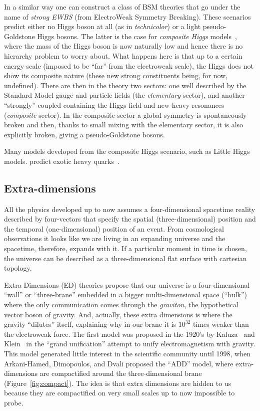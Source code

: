 In a similar way one can construct 
a class of BSM theories that go under the name
of {\it strong EWBS} (from ElectroWeak Symmetry Breaking).
These scenarios predict either no Higgs boson at all 
(as in {\it technicolor})
or a light pseudo-Goldstone Higgs bosons. The latter
is the case for {\it composite Higgs} models~\cite{Vecchi:2013bja,delAguila:2010vg}, 
where the mass of the Higgs boson is now naturally low and
hence there is no hierarchy problem to worry about.
What happens here is that up to a certain energy scale
(imposed to be ``far'' from the electroweak scale), the
Higgs does not show its composite nature (these new strong
constituents being, for now, undefined). There are then
in the theory two sectors: one well described by 
the Standard Model gauge and particle fields (the 
{\it elementary} sector), and another ``strongly'' coupled
containing the Higgs field and new heavy resonances 
({\it composite} sector).
In the composite sector a global symmetry is spontaneously 
broken and then, thanks to small mixing with the
elementary sector, it is also explicitly broken, giving
a pseudo-Goldstone bosons. 

Many models developed from the composite Higgs scenario,
such as Little Higgs models. predict
exotic heavy quarks~\cite{Contino:2008hi,Mrazek:2009yu}.


\subsection{Extra-dimensions}\label{sec:extradimensions}

All the physics developed up to now assumes a 
four-dimensional spacetime reality described 
by four-vectors that specify the spatial (three-dimensional) 
position and the temporal (one-dimensional) position of
an event.
From cosmological observations it looks like
we are living in an expanding universe and the
spacetime, therefore, expands with it.
If a particular moment in time is chosen, the
universe can be described as a three-dimensional 
flat surface with cartesian topology.

Extra Dimensions (ED) theories propose that
our universe is a four-dimensional ``wall'' or 
``three-brane'' embedded in a bigger multi-dimensional space 
(``bulk'') where the only communication comes through
the {\it graviton}, the hypothetical vector boson of gravity.
And, actually, these extra dimensions is where the gravity
``dilutes'' itself, explaining why in our brane it is
$10^{32}$ times weaker than the electroweak force.
The first model was proposed in the 1920's by
Kaluza~\cite{Kaluza} and Klein~\cite{Klein} 
in the ``grand unification''
attempt to unify electromagnetism with gravity.
This model generated little interest in the scientific community 
until 1998, when Arkani-Hamed, Dimopoulos, and Dvali
\cite{ArkaniHamed:1998rs} proposed the ``ADD'' model, 
where extra-dimensions are compactified around the 
three-dimensional brane (Figure~\ref{fig:compact}).
The idea is that extra dimensions are hidden to us because
they are compactified on very small scales up to now impossible
to probe.



